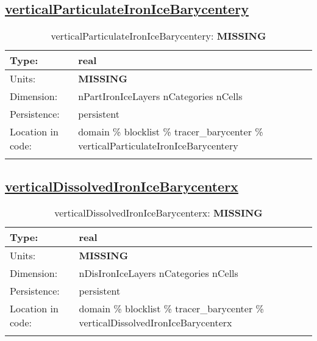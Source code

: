 \subsection[verticalParticulateIronIceBarycentery]{\hyperref[sec:var_tab_tracer_barycenter]{verticalParticulateIronIceBarycentery}}
\label{subsec:var_sec_tracer_barycenter_verticalParticulateIronIceBarycentery}
\begin{center}
\begin{longtable}{| p{2.0in} | p{4.0in} |}
        \hline 
        Type: & real \\
        \hline 
        Units: & {\bf \color{red} MISSING} \\
        \hline 
        Dimension: & nPartIronIceLayers nCategories nCells \\
        \hline 
        Persistence: & persistent \\
        \hline 
         Location in code: & domain \% blocklist \% tracer\_barycenter \% verticalParticulateIronIceBarycentery \\
         \hline 
    \caption{verticalParticulateIronIceBarycentery: {\bf \color{red} MISSING}}
\end{longtable}
\end{center}
\subsection[verticalDissolvedIronIceBarycenterx]{\hyperref[sec:var_tab_tracer_barycenter]{verticalDissolvedIronIceBarycenterx}}
\label{subsec:var_sec_tracer_barycenter_verticalDissolvedIronIceBarycenterx}
\begin{center}
\begin{longtable}{| p{2.0in} | p{4.0in} |}
        \hline 
        Type: & real \\
        \hline 
        Units: & {\bf \color{red} MISSING} \\
        \hline 
        Dimension: & nDisIronIceLayers nCategories nCells \\
        \hline 
        Persistence: & persistent \\
        \hline 
         Location in code: & domain \% blocklist \% tracer\_barycenter \% verticalDissolvedIronIceBarycenterx \\
         \hline 
    \caption{verticalDissolvedIronIceBarycenterx: {\bf \color{red} MISSING}}
\end{longtable}
\end{center}
